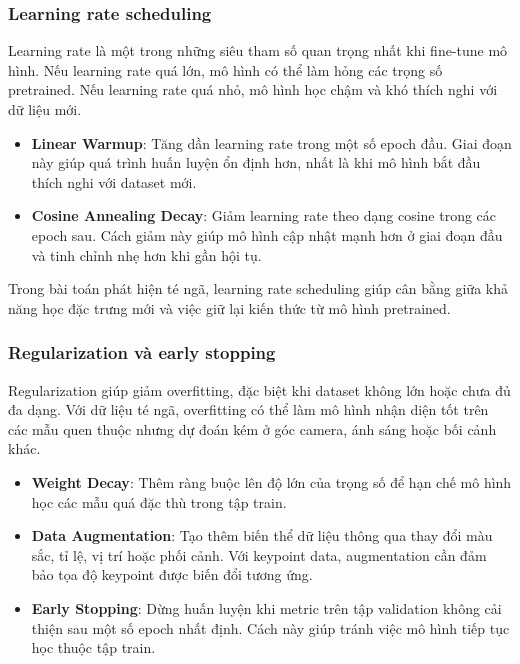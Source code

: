\documentclass[12pt, a4paper]{article}
\begin{document}
\subsubsection{Learning rate scheduling}
Learning rate là một trong những siêu tham số quan trọng nhất khi fine-tune mô hình.
Nếu learning rate quá lớn, mô hình có thể làm hỏng các trọng số pretrained.
Nếu learning rate quá nhỏ, mô hình học chậm và khó thích nghi với dữ liệu mới.

\begin{itemize}
  \item \textbf{Linear Warmup}: Tăng dần learning rate trong một số epoch đầu. Giai đoạn này giúp quá trình huấn luyện ổn định hơn, nhất là khi mô hình bắt đầu thích nghi với dataset mới.
  \item \textbf{Cosine Annealing Decay}: Giảm learning rate theo dạng cosine trong các epoch sau. Cách giảm này giúp mô hình cập nhật mạnh hơn ở giai đoạn đầu và tinh chỉnh nhẹ hơn khi gần hội tụ.
\end{itemize}

Trong bài toán phát hiện té ngã, learning rate scheduling giúp cân bằng giữa khả năng học đặc trưng mới và việc giữ lại kiến thức từ mô hình pretrained.

\subsubsection{Regularization và early stopping}
Regularization giúp giảm overfitting, đặc biệt khi dataset không lớn hoặc chưa đủ đa dạng.
Với dữ liệu té ngã, overfitting có thể làm mô hình nhận diện tốt trên các mẫu quen thuộc nhưng dự đoán kém ở góc camera, ánh sáng hoặc bối cảnh khác.

\begin{itemize}
  \item \textbf{Weight Decay}: Thêm ràng buộc lên độ lớn của trọng số để hạn chế mô hình học các mẫu quá đặc thù trong tập train.
  \item \textbf{Data Augmentation}: Tạo thêm biến thể dữ liệu thông qua thay đổi màu sắc, tỉ lệ, vị trí hoặc phối cảnh. Với keypoint data, augmentation cần đảm bảo tọa độ keypoint được biến đổi tương ứng.
  \item \textbf{Early Stopping}: Dừng huấn luyện khi metric trên tập validation không cải thiện sau một số epoch nhất định. Cách này giúp tránh việc mô hình tiếp tục học thuộc tập train.
\end{itemize}

\end{document}
